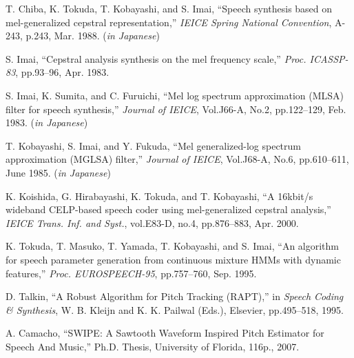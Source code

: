 \begin{thebibliography}{99}
T. Chiba, K. Tokuda, T. Kobayashi, and S. Imai,
``Speech synthesis based on mel-generalized cepstral representation,''
{\sl IEICE Spring National Convention},
A-243, p.243, Mar. 1988. ({\sl in Japanese})

S. Imai, 
``Cepstral analysis synthesis on the mel frequency scale,''
{\sl Proc. ICASSP-83},
pp.93--96, Apr. 1983.

S. Imai, K. Sumita, and C. Furuichi,
``Mel log spectrum approximation (MLSA) filter for speech synthesis,''
{\sl Journal of IEICE},
Vol.J66-A, No.2, pp.122--129, Feb. 1983. ({\sl in Japanese})

T. Kobayashi, S. Imai, and Y. Fukuda, 
``Mel generalized-log spectrum approximation (MGLSA) filter,''
{\sl Journal of IEICE},
Vol.J68-A, No.6, pp.610--611, June 1985. ({\sl in Japanese})

K. Koishida, G. Hirabayashi, K. Tokuda, and T. Kobayashi, 
``A 16kbit/s wideband CELP-based speech coder using mel-generalized cepstral analysis,'' 
{\sl IEICE Trans. Inf. and Syst.},
vol.E83-D, no.4, pp.876--883, Apr. 2000.


K. Tokuda, T. Masuko, T. Yamada, T. Kobayashi, and S. Imai,
``An algorithm for speech parameter generation
  from continuous mixture HMMs with dynamic features,''
{\sl Proc. EUROSPEECH-95}, pp.757--760, Sep. 1995.

D. Talkin, ``A Robust Algorithm for Pitch Tracking (RAPT),''
in {\sl Speech Coding \& Synthesis}, W. B. Kleijn and K. K. Pailwal
(Eds.), Elsevier, pp.495--518, 1995.

A. Camacho, ``SWIPE: A Sawtooth Waveform Inspired Pitch Estimator for Speech And Music,''
Ph.D. Thesis, University of Florida, 116p., 2007.
\end{thebibliography}
